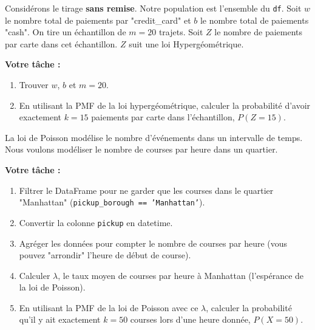 \begin{exercicebox}
Considérons le tirage \textbf{sans remise}. Notre population est l'ensemble du \texttt{df}.
Soit $w$ le nombre total de paiements par "credit\_card" et $b$ le nombre total de paiements "cash".
On tire un échantillon de $m=20$ trajets. Soit $Z$ le nombre de paiements par carte dans cet échantillon. $Z$ suit une loi Hypergéométrique.

\textbf{Votre tâche :}
\begin{enumerate}
    \item Trouver $w$, $b$ et $m=20$.
    \item En utilisant la PMF de la loi hypergéométrique, calculer la probabilité d'avoir exactement $k=15$ paiements par carte dans l'échantillon, $P(Z=15)$.
\end{enumerate}
\end{exercicebox}

\begin{exercicebox}
La loi de Poisson modélise le nombre d'événements dans un intervalle de temps. Nous voulons modéliser le nombre de courses par heure dans un quartier.

\textbf{Votre tâche :}
\begin{enumerate}
    \item Filtrer le DataFrame pour ne garder que les courses dans le quartier "Manhattan" (\texttt{pickup\_borough == 'Manhattan'}).
    \item Convertir la colonne \texttt{pickup} en datetime.
    \item Agréger les données pour compter le nombre de courses par heure (vous pouvez "arrondir" l'heure de début de course).
    \item Calculer $\lambda$, le taux moyen de courses par heure à Manhattan (l'espérance de la loi de Poisson).
    \item En utilisant la PMF de la loi de Poisson avec ce $\lambda$, calculer la probabilité qu'il y ait exactement $k=50$ courses lors d'une heure donnée, $P(X=50)$.
\end{enumerate}
\end{exercicebox}